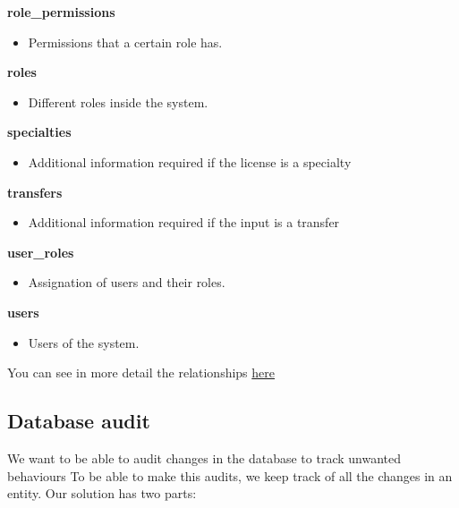 \textbf{role\_permissions}

\begin{itemize}
\tightlist
\item
  Permissions that a certain role has.
\end{itemize}

\textbf{roles}

\begin{itemize}
\tightlist
\item
  Different roles inside the system.
\end{itemize}

\textbf{specialties}

\begin{itemize}
\tightlist
\item
  Additional information required if the license is a specialty
\end{itemize}

\textbf{transfers}

\begin{itemize}
\tightlist
\item
  Additional information required if the input is a transfer
\end{itemize}

\textbf{user\_roles}

\begin{itemize}
\tightlist
\item
  Assignation of users and their roles.
\end{itemize}

\textbf{users}

\begin{itemize}
\tightlist
\item
  Users of the system.
\end{itemize}

You can see in more detail the relationships \href{'./schema.pdf'}{here}

\hypertarget{database-audit}{%
\subsection{Database audit}\label{database-audit}}

We want to be able to audit changes in the database to track unwanted
behaviours To be able to make this audits, we keep track of all the
changes in an entity. Our solution has two parts:

